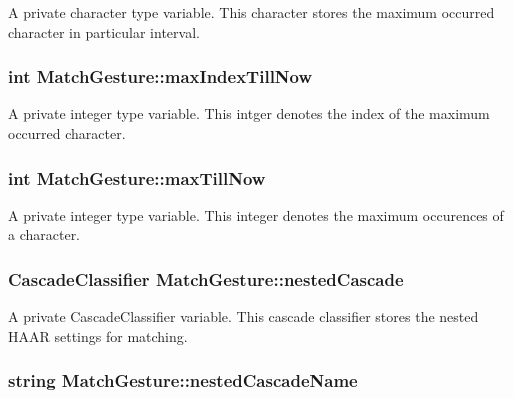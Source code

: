\label{classMatchGesture_a32a7db9f36bf5d23d764ef57bc467528}
A private character type variable. This character stores the maximum occurred character in particular interval. \hypertarget{classMatchGesture_aefd5499b36ad81c08912b6566c5b42a0}{
\subsubsection[{maxIndexTillNow}]{\setlength{\rightskip}{0pt plus 5cm}int {\bf MatchGesture::maxIndexTillNow}}}
\label{classMatchGesture_aefd5499b36ad81c08912b6566c5b42a0}
A private integer type variable. This intger denotes the index of the maximum occurred character. \hypertarget{classMatchGesture_a16665c0e1aa834c04a404141faf0a35b}{
\subsubsection[{maxTillNow}]{\setlength{\rightskip}{0pt plus 5cm}int {\bf MatchGesture::maxTillNow}}}
\label{classMatchGesture_a16665c0e1aa834c04a404141faf0a35b}
A private integer type variable. This integer denotes the maximum occurences of a character. \hypertarget{classMatchGesture_aa938a749d3ef32508803cfd4fbf30c0a}{
\subsubsection[{nestedCascade}]{\setlength{\rightskip}{0pt plus 5cm}CascadeClassifier {\bf MatchGesture::nestedCascade}}}
\label{classMatchGesture_aa938a749d3ef32508803cfd4fbf30c0a}
A private CascadeClassifier variable. This cascade classifier stores the nested HAAR settings for matching. \hypertarget{classMatchGesture_aacb8c478358eee5b075988893f267737}{
\subsubsection[{nestedCascadeName}]{\setlength{\rightskip}{0pt plus 5cm}string {\bf MatchGesture::nestedCascadeName}}}

